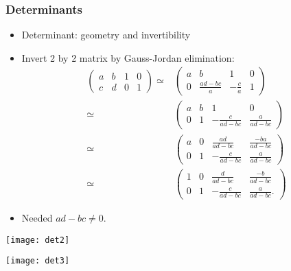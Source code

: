\documentclass[compress]{beamer}
\begin{document}
\begin{frame}
  \frametitle{Determinants}
  \begin{itemize}
  \item Determinant: geometry and invertibility
  \item Invert 2 by 2 matrix by Gauss-Jordan elimination:
    \begin{align*}
      \begin{pmatrix} a & b & 1 & 0 \\
        c & d & 0 & 1 
      \end{pmatrix} \simeq & 
      \begin{pmatrix} a & b & 1 & 0 \\
        0 & \frac{ad-bc}{a} & -\frac{c}{a} & 1 
      \end{pmatrix} \\
      \simeq & 
      \begin{pmatrix} a & b & 1 & 0 \\
        0 & 1 & -\frac{c}{ad-bc} & \frac{a}{ad-bc}
      \end{pmatrix} \\
      \simeq & 
      \begin{pmatrix} a & 0 & \frac{ad}{ad-bc} & \frac{-ba}{ad-bc} \\
        0 & 1 & -\frac{c}{ad-bc} & \frac{a}{ad-bc}
      \end{pmatrix} \\
      \simeq & 
      \begin{pmatrix} 1 & 0 & \frac{d}{ad-bc} & \frac{-b}{ad-bc} \\
        0 & 1 & -\frac{c}{ad-bc} & \frac{a}{ad-bc}.
      \end{pmatrix}
    \end{align*}
  \item Needed $ad-bc \neq 0$.
  \end{itemize}
\end{frame}

\begin{frame}
  \texttt{[image: det2]}
\end{frame}

\begin{frame}
  \texttt{[image: det3]} 
\end{frame}
\end{document}
